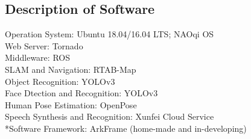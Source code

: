 \subsection*{Description of Software}
Operation System: Ubuntu 18.04/16.04 LTS; NAOqi OS \\
Web Server: Tornado \\
Middleware: ROS \\
SLAM and Navigation: RTAB-Map \\
Object Recognition: YOLOv3 \\
Face Dtection and Recognition: YOLOv3 \\
Human Pose Estimation:  OpenPose \\
Speech Synthesis and Recognition: Xunfei Cloud Service\\
*Software Framework: ArkFrame (home-made and in-developing)